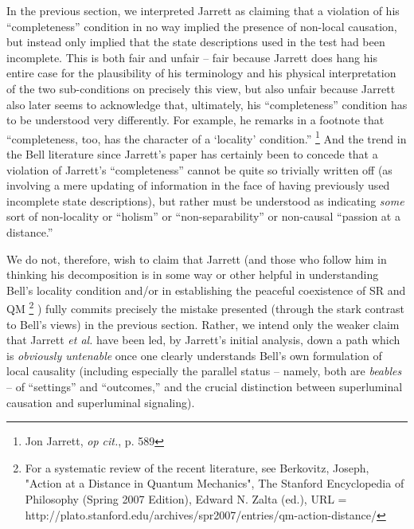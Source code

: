 \documentclass[12pt]{article}
\begin{document}
In the previous section, we interpreted Jarrett as claiming that a
violation of his ``completeness'' condition in no way implied the
presence of non-local causation, but instead only implied that the
state descriptions used in the test had been incomplete.  This is both
fair and unfair -- fair because Jarrett does hang his entire case for
the plausibility of his terminology and his physical interpretation of
the two sub-conditions on precisely this view, but also unfair because
Jarrett also later seems to acknowledge that, ultimately, his
``completeness'' condition has to be understood very differently.  For
example, he remarks in a footnote that ``completeness, too, has the
character of a `locality' condition.''  \footnote{Jon Jarrett,
  \emph{op cit.}, p. 589}  And the trend in the Bell
literature since Jarrett's paper has certainly been to concede that a
violation of Jarrett's ``completeness'' cannot be quite so trivially
written off (as involving a mere updating of information in the face
of having previously used incomplete state descriptions), but rather
must be understood as indicating \emph{some} sort of non-locality or
``holism'' or ``non-separability'' or non-causal ``passion at a
distance.''  

We do not, therefore, wish to claim that Jarrett (and those who follow
him in thinking his decomposition is in some way or other helpful in
understanding Bell's locality condition and/or in establishing the
peaceful coexistence of SR and QM  \footnote{For a systematic
  review of the recent literature, see Berkovitz, Joseph, "Action at a
  Distance in Quantum Mechanics", The Stanford Encyclopedia of
  Philosophy (Spring 2007 Edition), Edward N. Zalta (ed.), URL =
  http://plato.stanford.edu/archives/spr2007/entries/qm-action-distance/}
) fully commits precisely the mistake presented (through the stark
contrast to Bell's views) in the previous section.  Rather, we intend
only the weaker claim that Jarrett \emph{et al.} have been led, by
Jarrett's initial analysis, down a path which is \emph{obviously
  untenable} once one clearly understands Bell's own formulation of
local causality (including especially the parallel status -- namely,
both are \emph{beables} -- of ``settings'' and ``outcomes,'' and the 
crucial distinction between superluminal causation and superluminal 
signaling).  
\end{document}
